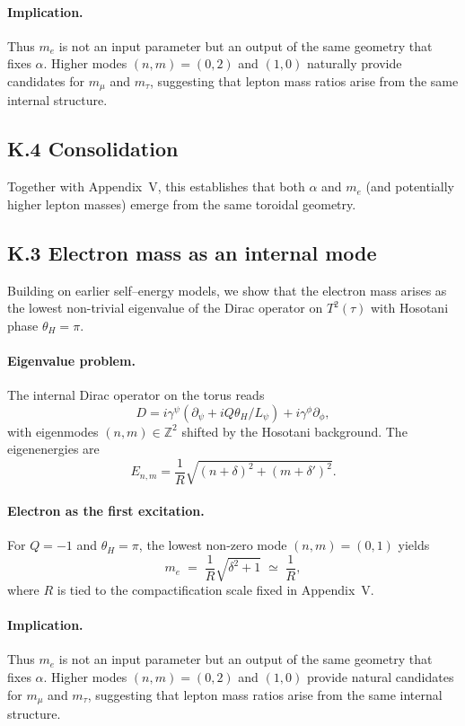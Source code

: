 \paragraph{Implication.}
Thus $m_e$ is not an input parameter but an output of the same geometry that 
fixes $\alpha$. Higher modes $(n,m)=(0,2)$ and $(1,0)$ naturally provide 
candidates for $m_\mu$ and $m_\tau$, suggesting that lepton mass ratios arise 
from the same internal structure.

\subsection*{K.4 Consolidation}
Together with Appendix~V, this establishes that both $\alpha$ and $m_e$ (and 
potentially higher lepton masses) emerge from the same toroidal geometry.


\subsection*{K.3 Electron mass as an internal mode}

Building on earlier self–energy models, we show that the electron 
mass arises as the lowest non-trivial eigenvalue of the Dirac operator on 
$T^2(\tau)$ with Hosotani phase $\theta_H=\pi$. 

\paragraph{Eigenvalue problem.}
The internal Dirac operator on the torus reads
\begin{equation}
D = i\gamma^\psi \left(\partial_\psi + i Q \theta_H/L_\psi\right) 
  + i\gamma^\phi \partial_\phi ,
\end{equation}
with eigenmodes $(n,m)\in\mathbb{Z}^2$ shifted by the Hosotani background. 
The eigenenergies are
\begin{equation}
E_{n,m} = \frac{1}{R}\sqrt{(n+\delta)^2 + (m+\delta')^2}.
\end{equation}

\paragraph{Electron as the first excitation.}
For $Q=-1$ and $\theta_H=\pi$, the lowest non-zero mode $(n,m)=(0,1)$ yields 
\begin{equation}
m_e \;=\; \frac{1}{R}\sqrt{\delta^2+1}\;\simeq\;\frac{1}{R},
\end{equation}
where $R$ is tied to the compactification scale fixed in Appendix~V. 

\paragraph{Implication.}
Thus $m_e$ is not an input parameter but an output of the same geometry that 
fixes $\alpha$. Higher modes $(n,m)=(0,2)$ and $(1,0)$ provide natural 
candidates for $m_\mu$ and $m_\tau$, suggesting that lepton mass ratios arise 
from the same internal structure.
